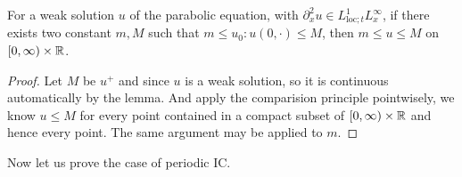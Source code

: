 \begin{lemma}
    For a weak solution $u$ of the parabolic equation, with $\partial_x^2 u \in L^1_{\text{loc};t}L^{\infty}_x$, if there exists two constant $m,M$ such that $m \leq u_0:u(0,\cdot) \leq M$, then $m \leq u \leq M$ on $[0,\infty)\times\mathbb{R}$.
\end{lemma}
\begin{proof}
    Let $M$ be $u^+$ and since $u$ is a weak solution, so it is continuous automatically by the lemma. And apply the comparision principle pointwisely, we know $u \leq M$ for every point contained in a compact subset of $[0,\infty)\times \mathbb{R}$ and hence every point. The same argument may be applied to $m$.
\end{proof}

Now let us prove the case of periodic IC.

